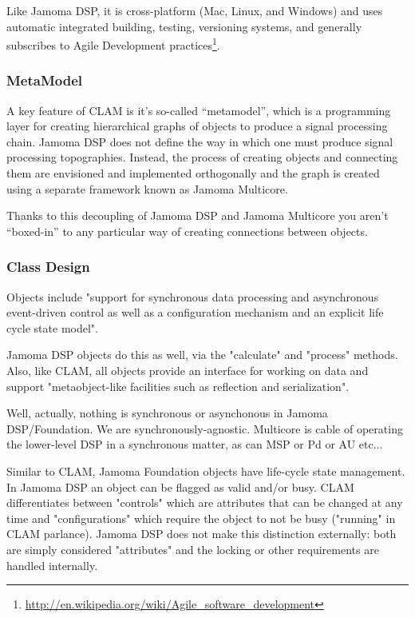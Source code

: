 \documentclass[twoside,10pt]{article}
\begin{document}
Like Jamoma DSP, it is cross-platform (Mac, Linux, and Windows) and uses automatic integrated building, testing, versioning systems, and generally subscribes to Agile Development practices\footnote{\url{http://en.wikipedia.org/wiki/Agile_software_development}}.  
                                      
\subsubsection{MetaModel}

A key feature of CLAM is it's so-called ``metamodel'', which is a programming layer for creating hierarchical graphs of objects to produce a signal processing chain.  Jamoma DSP does not define the way in which one must produce signal processing topographies.  Instead, the process of creating objects and connecting them are envisioned and implemented orthogonally and the graph is created using a separate framework known as Jamoma Multicore.

Thanks to this decoupling of Jamoma DSP and Jamoma Multicore you aren't ``boxed-in'' to any particular way of creating connections between objects.

\subsubsection{Class Design}

Objects include "support for synchronous data processing and asynchronous event-driven control as well as a configuration mechanism and an explicit life cycle state model". 

Jamoma DSP objects do this as well, via the "calculate" and "process" methods.  Also, like CLAM, all objects provide an interface for working on data and support "metaobject-like facilities such as reflection and serialization".

Well, actually, nothing is synchronous or asynchonous in Jamoma DSP/Foundation.  We are synchronously-agnostic.  Multicore is cable of operating the lower-level DSP in a synchronous matter, as can MSP or Pd or AU etc...

Similar to CLAM, Jamoma Foundation objects have life-cycle state management.  In Jamoma DSP an object can be flagged as valid and/or busy.  CLAM differentiates between "controls" which are attributes that can be changed at any time and "configurations" which require the object to not be busy ("running" in CLAM parlance).  Jamoma DSP does not make this distinction externally: both are simply considered "attributes" and the locking or other requirements are handled internally. 
\end{document}
